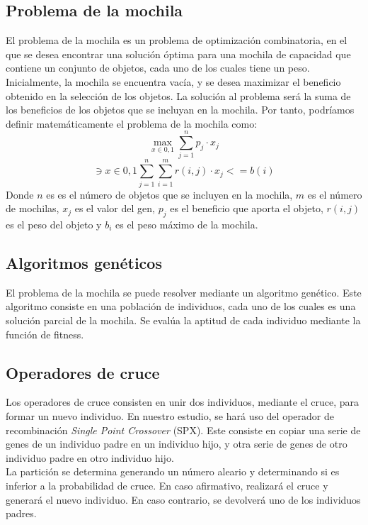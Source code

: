 \documentclass[runningheads]{llncs}
\begin{document}
\subsection{Problema de la mochila}
El problema de la mochila es un problema de optimización combinatoria, en el que se desea
encontrar una solución óptima para una mochila de capacidad que contiene un conjunto de
objetos, cada uno de los cuales tiene un peso.\\
Inicialmente, la mochila se encuentra vacía, y se desea maximizar el beneficio obtenido
en la selección de los objetos. La solución al problema será la suma de los beneficios de los objetos
que se incluyan en la mochila.
Por tanto, podríamos definir matemáticamente el problema de la mochila como:
\begin{equation}
	\max_{x \in {0, 1}} \sum_{j=1}^n p_j \cdot x_j
\end{equation}
\begin{equation}
	\ni {x \in {0, 1}} \sum_{j=1}^n \sum_{i=1}^m r(i,j) \cdot x_j <= b(i)
\end{equation}
Donde $n$ es es el número de objetos que se incluyen en la mochila, $m$ es el número de mochilas, $x_j$ es el valor del gen,
$p_j$ es el beneficio que aporta el objeto, $r(i,j)$ es el peso del objeto y $b_i$ es el peso máximo de la mochila.

\subsection{Algoritmos genéticos}
El problema de la mochila se puede resolver mediante un algoritmo genético.
Este algoritmo consiste en una población de individuos, cada uno de los cuales es una solución
parcial de la mochila. Se evalúa la aptitud de cada individuo mediante la función de fitness.

\subsection{Operadores de cruce}
Los operadores de cruce consisten en unir dos individuos, mediante el cruce, para formar un
nuevo individuo. En nuestro estudio, se hará uso del operador de recombinación \textit{Single Point Crossover} \cite{ref_spx} (SPX).
Este consiste en copiar una serie de genes de un individuo padre en un individuo hijo,
y otra serie de genes de otro individuo padre en otro individuo hijo.\\
La partición se determina generando un número aleario y determinando si es inferior a la probabilidad de cruce.
En caso afirmativo, realizará el cruce y generará el nuevo individuo. En caso contrario, se devolverá uno de los individuos padres.
\end{document}
